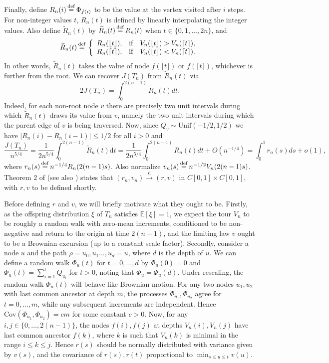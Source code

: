 \documentclass[11pt]{article}
\newcommand{\E}[1]{\mathbb{E} \left[#1\right]}
\def\QQ{Q}
\def\F{\Phi}
\def\r{\rho}
\numberwithin{theorem}{section}
\theoremstyle{definition}
\newcommand{\eqd}{\,{\buildrel {\mathrm{def}} \over =}\,}
\numberwithin{equation}{section}
\newcommand{\too}{\longrightarrow}
\newcommand\dto{\overset{\mathrm{d}}{\too}}
\begin{document}
Finally, define $R_n(i) \eqd \F_{f(i)}$ to be the value at the vertex visited after $i$ steps. For non-integer values $t$, $R_n(t)$ is defined by linearly interpolating the integer values. Also define $\widetilde{R}_n(t)$ by $\widetilde{R}_n(t) \eqd R_n(t)$ when $t\in \{0,1,\dots,2n\}$, and
$$
\widetilde{R}_n(t) \eqd \left\{\begin{array}{lcl}
R_n(\lfloor t\rfloor), & \text{if} & V_n(\lfloor t\rfloor) > V_n(\lceil t\rceil), \\
R_n(\lceil t\rceil), & \text{if} & V_n(\lfloor t\rfloor) < V_n(\lceil t\rceil).
\end{array}\right.
$$
In other words, $\widetilde{R}_n(t)$ takes the value of node $f(\lfloor t\rfloor)$ or $f(\lceil
t\rceil)$, whichever is further from the root. We can recover $J(T_n)$ from $\widetilde{R}_n(t)$ via
$$
2J(T_n) = \int_0^{2(n-1)} \widetilde{R}_n(t)dt.
$$
Indeed, for each non-root node $v$ there are precisely two unit intervals during which $\widetilde{R}_n(t)$ draws its value from $v$, namely the two unit intervals during which the parent edge of $v$ is being traversed. Now, since $\QQ_v\sim \text{Unif}(-1/2,1/2)$ we have $|R_n(i) - R_n(i-1)| \leq 1/2$ for all $i>0$ and
$$
\frac{J(T_n)}{n^{5/4}} = \frac{1}{2n^{5/4}} \int_{0}^{2(n-1)} \widetilde{R}_n(t) \mathrm dt =
\frac{1}{2n^{5/4}} \int_0^{2(n-1)} R_n(t) dt + O(n^{-1/4}) = \int_0^1r_n(s)ds + o(1),
$$
where $r_n(s) \eqd n^{-1/4}R_n(2(n-1)s)$. 
Also normalize $v_n(s) \eqd n^{-1/2}V_n(2(n-1)s)$. Theorem 2 of
\cite{jm05} 
(see also \cite{MR2033198})
states that $(r_n, v_n) \dto (r, v)$ in $C[0,1] \times C[0,1]$, with $r,v$ to be defined
shortly. 

Before defining $r$ and $v$, we will briefly motivate what they ought to be. Firstly, as the
offspring distribution $\xi$ of $T_n$ satisfies $\E{\xi} = 1$, we expect the
tour $V_n$ to be roughly a
random walk with zero-mean increments, conditioned to be non-negative and return to the origin at
time $2(n-1)$, and the limiting law $v$ ought to be a Brownian excursion (up
to a constant scale factor).
Secondly, consider a node $u$
and the path $\r = u_0,u_1\dots,u_d = u$, where $d$ is the depth of $u$. We can define a random walk
$\F_u(t)$ for $t=0,\dots,d$ by $\F_u(0) = 0$ and $\F_u(t) = \sum_{i=1}^t \QQ_{u_{i}}$ for $t > 0$,
noting that $\F_u = \F_u(d)$. Under rescaling, the random walk $\F_u(t)$ will behave like Brownian
motion. For any two nodes $u_1,u_2$ with last common ancestor at depth $m$, the processes $\F_{u_1},
\F_{u_2}$ agree for $t=0,\dots,m$, while any subsequent increments are independent. Hence
$\text{Cov}(\F_{u_1}, \F_{u_2}) = cm$ for some constant $c > 0$. Now, for any
$i,j\in\{0,\dots,2(n-1)\}$, the nodes $f(i), f(j)$ at depths $V_n(i), V_n(j)$ have last common ancestor
$f(k)$, where $k$ is such that $V_n(k)$ is minimal in the range $i\leq k\leq j$. Hence $r(s)$ should
be normally distributed with variance given by $v(s)$, and the covariance of $r(s), r(t)$
proportional to $\min_{s\leq u\leq t} v(u)$.
\end{document}
